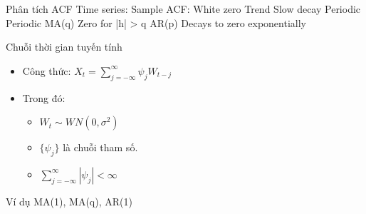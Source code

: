 Phân tích ACF
Time series: Sample ACF:
White zero
Trend Slow decay
Periodic Periodic
MA(q) Zero for |h| > q
AR(p) Decays to zero exponentially

\begin{block}{Chuỗi thời gian tuyến tính}
\begin{itemize}
\item Công thức: $X_t = \sum_{j = - \infty}^{\infty} \psi_j W_{t - j} $
\item Trong đó:
\begin{itemize}[label = $\diamond$]
\item ${W_t} \sim WN(0, \sigma^2)$
\item $ \{\psi_j\} $ là chuỗi tham số.
\item $\sum_{j = - \infty}^{\infty} |\psi_j| < \infty $
\end{itemize}
\end{itemize}
\end{block}

Ví dụ MA(1), MA(q), AR(1)